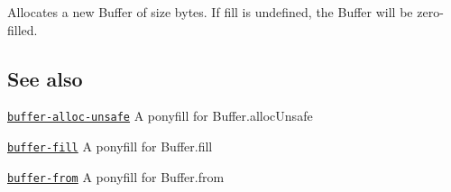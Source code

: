 Allocates a new {\ttfamily Buffer} of {\ttfamily size} bytes. If {\ttfamily fill} is {\ttfamily undefined}, the {\ttfamily Buffer} will be zero-\/filled.

\subsection*{See also}


\begin{DoxyItemize}
\item \href{https://github.com/LinusU/buffer-alloc-unsafe}{\tt buffer-\/alloc-\/unsafe} A ponyfill for {\ttfamily Buffer.\+alloc\+Unsafe}
\item \href{https://github.com/LinusU/buffer-fill}{\tt buffer-\/fill} A ponyfill for {\ttfamily Buffer.\+fill}
\item \href{https://github.com/LinusU/buffer-from}{\tt buffer-\/from} A ponyfill for {\ttfamily Buffer.\+from} 
\end{DoxyItemize}
